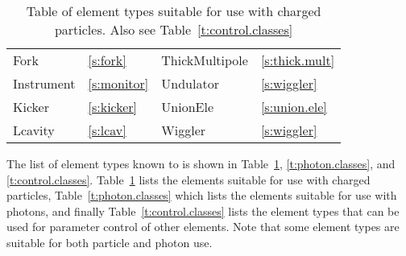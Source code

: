 \begin{table}[htb]
{\begin{tabular}{llll}
  Fork             & \ref{s:fork}          &  ThickMultipole    & \ref{s:thick.mult}  \\
  Instrument       & \ref{s:monitor}       &  Undulator         & \ref{s:wiggler}     \\
  Kicker           & \ref{s:kicker}        &  UnionEle          & \ref{s:union.ele}   \\
  Lcavity          & \ref{s:lcav}          &  Wiggler           & \ref{s:wiggler}     \\
  \bottomrule
\end{tabular}
} \caption{Table of element types suitable for use with charged particles. Also see
Table~\ref{t:control.classes}} \label{t:particle.classes}
\end{table}

The list of element types known to \bmad is shown
in Table~\ref{t:particle.classes}, \ref{t:photon.classes}, and \ref{t:control.classes}.
Table~\ref{t:particle.classes} lists the elements suitable for use with charged particles,
Table~\ref{t:photon.classes} which lists the elements suitable for use with photons, and finally
Table~\ref{t:control.classes} lists the  element types that can be used for parameter
control of other elements. Note that some element types are suitable for both particle and photon
use.

